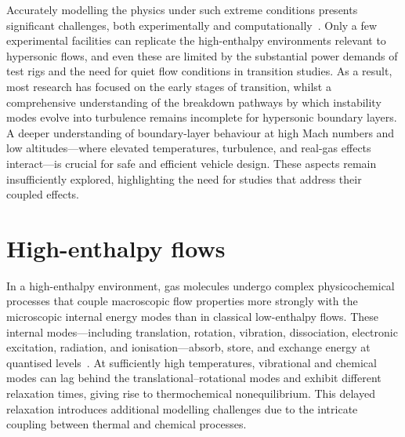 Accurately modelling the physics under such extreme conditions presents significant challenges, both experimentally and computationally~\citep{DiRenzo2021}. Only a few experimental facilities can replicate the high-enthalpy environments relevant to hypersonic flows, and even these are limited by the substantial power demands of test rigs and the need for quiet flow conditions in transition studies. As a result, most research has focused on the early stages of transition, whilst a comprehensive understanding of the breakdown pathways by which instability modes evolve into turbulence remains incomplete for hypersonic boundary layers. A deeper understanding of boundary-layer behaviour at high Mach numbers and low altitudes---where elevated temperatures, turbulence, and real-gas effects interact---is crucial for safe and efficient vehicle design. These aspects remain insufficiently explored, highlighting the need for studies that address their coupled effects.

\section{High-enthalpy flows}
In a high-enthalpy environment, gas molecules undergo complex physicochemical processes that couple macroscopic flow properties more strongly with the microscopic internal energy modes than in classical low-enthalpy flows. These internal modes---including translation, rotation, vibration, dissociation, electronic excitation, radiation, and ionisation---absorb, store, and exchange energy at quantised levels~\cite[ch.~11]{Anderson2019}. At sufficiently high temperatures, vibrational and chemical modes can lag behind the translational--rotational modes and exhibit different relaxation times, giving rise to thermochemical nonequilibrium. This delayed relaxation introduces additional modelling challenges due to the intricate coupling between thermal and chemical processes.

